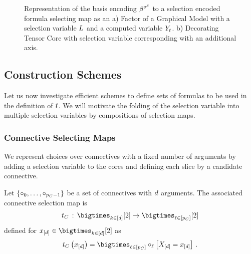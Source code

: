 \begin{figure}[t]
    \begin{center}
        
    \end{center}
    \caption{Representation of the basis encoding $\beta^{\sigma^{t}}$ to a selection encoded formula selecting map as an
    a) Factor of a Graphical Model with a selection variable $L$ and a computed variable $Y_{t}$.
    b) Decorating Tensor Core with selection variable corresponding with an additional axis.}
    \label{fig:formulaSelectionMap}
\end{figure}


\subsection{Construction Schemes}

Let us now investigate efficient schemes to define sets of formulas to be used in the definition of $t$.
We will motivate the folding of the selection variable into multiple selection variables by compositions of selection maps.


\subsubsection{Connective Selecting Maps} %

We represent choices over connectives with a fixed number of arguments by adding a selection variable to the cores and defining each slice by a candidate connective.

\begin{definition}
    \label{def:connectiveSelector}
    Let $\{\circ_{0},\ldots,\circ_{p_{C}-1}\}$ be a set of connectives with $d$ arguments.
    The associated connective selection map is
    \begin{align*}
        \cselectionmap\defcols \atomstates \rightarrow \bigtimes_{\selindex\in[\seldimof{\cselectionsymbol}]}[2]
    \end{align*}
    defined for $\shortcatindices\in\atomstates$ as
    \begin{align*}
        \cselectionmapat{\shortcatindices} = \bigtimes_{\selindex\in[\seldimof{\cselectionsymbol}]} \connectiveofat{\selindex}{\shortcatvariables=\shortcatindices} \, .
    \end{align*}
\end{definition}


